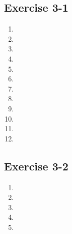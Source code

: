 \subsection{Exercise 3-1} %
\begin{multicols}{2}
\begin{enumerate}[label=\textbf{\arabic*}., itemsep=5pt]
 \item %
 \item %
 \item %
 \item %
 \item %
 \item %
 \item %
 \item %
 \item %
 \item %
 \item %
 \item %
\end{enumerate}
\end{multicols}
\subsection{Exercise 3-2} %
\begin{multicols}{2}
\begin{enumerate}[label=\textbf{\arabic*}., itemsep=5pt]
 \item %
 \item %
 \item %
 \item %
 \item %
\end{enumerate}
\end{multicols}
